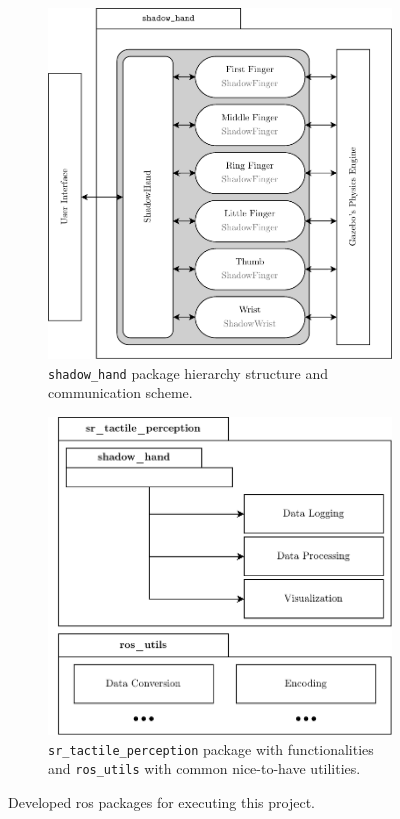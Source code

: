 \begin{figure}[!h]
	\centering
	\begin{subfigure}[b]{0.48\textwidth}
		\centering
		\includegraphics[width=\textwidth]{chapters/system-setup/fig/produced-software-diagram.pdf}
		\caption{\texttt{shadow\_hand} package hierarchy structure and communication scheme.}
		\label{fig:shadow-hand}
	\end{subfigure}
	\hfill
	\begin{subfigure}[b]{0.48\textwidth}
		\centering
		\includegraphics[width=\textwidth]{chapters/system-setup/fig/tactile-perception-package.pdf}
		\caption{\texttt{sr\_tactile\_perception} package with functionalities and \texttt{ros\_utils} with common nice-to-have utilities.}
		\label{fig:tactile-perception-package}
	\end{subfigure}
	\caption{Developed \gls{ros} packages for executing this project.}
	\label{fig:shadow-hand-tactile-perception-package}
\end{figure}